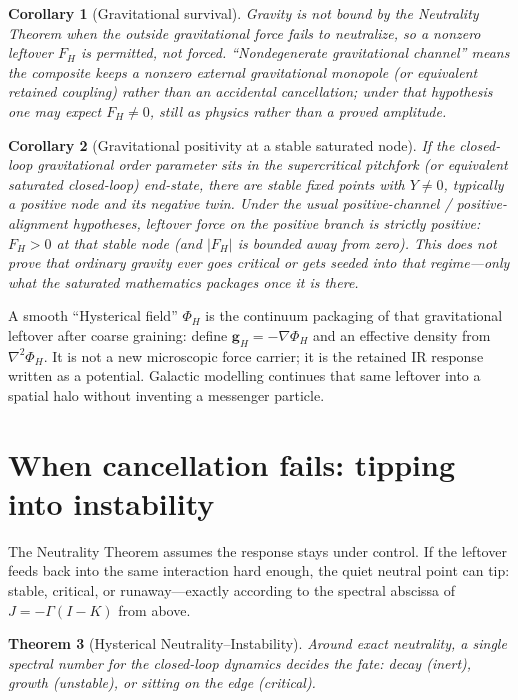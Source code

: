 \documentclass[11pt]{article}
\newtheorem{theorem}{Theorem}[section]
\newtheorem{corollary}[theorem]{Corollary}
\theoremstyle{remark}
\newcommand{\Gm}{\Gamma}
\begin{document}
\begin{corollary}[Gravitational survival]
Gravity is not bound by the Neutrality Theorem when the outside gravitational force fails to neutralize, so a nonzero leftover $F_H$ is \emph{permitted}, not forced.
``Nondegenerate gravitational channel'' means the composite keeps a nonzero external gravitational monopole (or equivalent retained coupling) rather than an accidental cancellation; under that hypothesis one may \emph{expect} $F_H\neq0$, still as physics rather than a proved amplitude.
\end{corollary}

\begin{corollary}[Gravitational positivity at a stable saturated node]
If the closed-loop gravitational order parameter sits in the supercritical pitchfork (or equivalent saturated closed-loop) end-state, there are stable fixed points with $Y\neq0$, typically a positive node and its negative twin.
Under the usual positive-channel / positive-alignment hypotheses, leftover force on the positive branch is strictly positive: $F_H>0$ at that stable node (and $|F_H|$ is bounded away from zero).
This does \emph{not} prove that ordinary gravity ever goes critical or gets seeded into that regime---only what the saturated mathematics packages once it is there.
\end{corollary}

A smooth ``Hysterical field'' $\Phi_H$ is the continuum packaging of that gravitational leftover after coarse graining: define $\mathbf g_H=-\nabla\Phi_H$ and an effective density from $\nabla^2\Phi_H$.
It is not a new microscopic force carrier; it is the retained IR response written as a potential.
Galactic modelling continues that same leftover into a spatial halo without inventing a messenger particle.

\section{When cancellation fails: tipping into instability}
The Neutrality Theorem assumes the response stays under control.
If the leftover feeds back into the same interaction hard enough, the quiet neutral point can tip: stable, critical, or runaway---exactly according to the spectral abscissa of $J=-\Gm(I-K)$ from above.

\begin{theorem}[Hysterical Neutrality--Instability]
Around exact neutrality, a single spectral number for the closed-loop dynamics decides the fate: decay (inert), growth (unstable), or sitting on the edge (critical).
\end{theorem}
\end{document}
